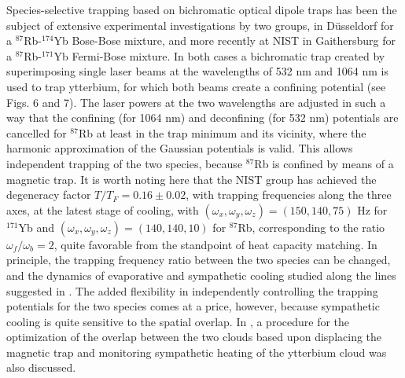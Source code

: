 \documentclass[pra,letterpaper,twocolumn,showpacs,superscriptaddress]{revtex4}
\begin{document}
Species-selective trapping based on bichromatic optical dipole traps has been the subject of extensive experimental 
investigations by two groups, in D\"usseldorf \cite{Tassy2010,Baumer2011} for a ${}^{87}$Rb-${}^{174}$Yb Bose-Bose mixture, 
and more recently at NIST in Gaithersburg \cite{Vaidya2015} for a ${}^{87}$Rb-${}^{171}$Yb Fermi-Bose mixture. 
In both cases a bichromatic trap created by superimposing single laser beams at the wavelengths of 532 nm 
and 1064 nm is used to trap ytterbium, for which both beams create a confining potential (see Figs. 6 and 7).
The laser powers at the two wavelengths are adjusted in such a way that the confining (for 1064 nm) 
and deconfining (for 532 nm) potentials are cancelled for ${}^{87}$Rb at least in the trap minimum and its vicinity, 
where the harmonic approximation of the Gaussian potentials is valid. This allows independent 
trapping of the two species, because ${}^{87}$Rb is confined by means of a magnetic trap. 
It is worth noting here that the NIST group has achieved the degeneracy factor  $T/T_F=0.16 \pm 0.02$, with trapping frequencies along the three axes, 
at the latest stage of cooling, with $(\omega_x,\omega_y,\omega_z)=(150,140,75)$ Hz for ${}^{171}$Yb 
and $(\omega_x,\omega_y,\omega_z)=(140,140,10)$ for ${}^{87}$Rb, corresponding to the ratio
$\omega_f/\omega_b=2$, quite favorable from the standpoint of heat capacity matching.
In principle, the trapping frequency ratio between the two species can be changed, and the dynamics of evaporative and 
sympathetic cooling studied along the lines suggested in \cite{Presilla2003,Onofrio2004,Brown2008}. 
The added flexibility in independently controlling the trapping potentials for the two species comes at a price, however, because  
sympathetic cooling is quite sensitive to the spatial overlap. In \cite{Vaidya2015}, a procedure for the optimization of the 
overlap between the two clouds based upon displacing the magnetic trap and monitoring sympathetic heating 
of the ytterbium cloud was also discussed. 
\end{document}
